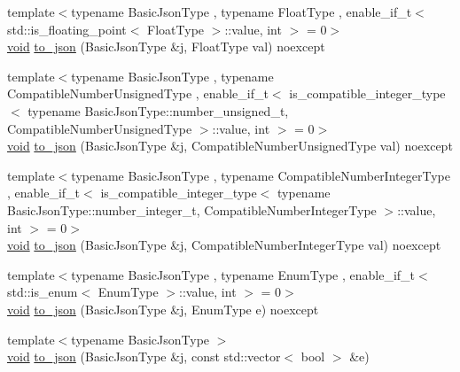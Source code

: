 \begin{DoxyCompactItemize}
\item 
{\footnotesize template$<$typename Basic\+Json\+Type , typename Float\+Type , enable\+\_\+if\+\_\+t$<$ std\+::is\+\_\+floating\+\_\+point$<$ Float\+Type $>$\+::value, int $>$  = 0$>$ }\\\mbox{\hyperlink{namespacenlohmann_1_1detail_a59fca69799f6b9e366710cb9043aa77d}{void}} \mbox{\hyperlink{namespacenlohmann_1_1detail_a22bffdc8bc7e43af380ba2050696b230}{to\+\_\+json}} (Basic\+Json\+Type \&j, Float\+Type val) noexcept
\item 
{\footnotesize template$<$typename Basic\+Json\+Type , typename Compatible\+Number\+Unsigned\+Type , enable\+\_\+if\+\_\+t$<$ is\+\_\+compatible\+\_\+integer\+\_\+type$<$ typename Basic\+Json\+Type\+::number\+\_\+unsigned\+\_\+t, Compatible\+Number\+Unsigned\+Type $>$\+::value, int $>$  = 0$>$ }\\\mbox{\hyperlink{namespacenlohmann_1_1detail_a59fca69799f6b9e366710cb9043aa77d}{void}} \mbox{\hyperlink{namespacenlohmann_1_1detail_ae5fd66b5517b3b5a6c6b9fd9f29ba8dc}{to\+\_\+json}} (Basic\+Json\+Type \&j, Compatible\+Number\+Unsigned\+Type val) noexcept
\item 
{\footnotesize template$<$typename Basic\+Json\+Type , typename Compatible\+Number\+Integer\+Type , enable\+\_\+if\+\_\+t$<$ is\+\_\+compatible\+\_\+integer\+\_\+type$<$ typename Basic\+Json\+Type\+::number\+\_\+integer\+\_\+t, Compatible\+Number\+Integer\+Type $>$\+::value, int $>$  = 0$>$ }\\\mbox{\hyperlink{namespacenlohmann_1_1detail_a59fca69799f6b9e366710cb9043aa77d}{void}} \mbox{\hyperlink{namespacenlohmann_1_1detail_a91fe576be579c8c2fdd14610605c6dd2}{to\+\_\+json}} (Basic\+Json\+Type \&j, Compatible\+Number\+Integer\+Type val) noexcept
\item 
{\footnotesize template$<$typename Basic\+Json\+Type , typename Enum\+Type , enable\+\_\+if\+\_\+t$<$ std\+::is\+\_\+enum$<$ Enum\+Type $>$\+::value, int $>$  = 0$>$ }\\\mbox{\hyperlink{namespacenlohmann_1_1detail_a59fca69799f6b9e366710cb9043aa77d}{void}} \mbox{\hyperlink{namespacenlohmann_1_1detail_a0c8b159dba71981d6c555d284cf6e2bf}{to\+\_\+json}} (Basic\+Json\+Type \&j, Enum\+Type e) noexcept
\item 
{\footnotesize template$<$typename Basic\+Json\+Type $>$ }\\\mbox{\hyperlink{namespacenlohmann_1_1detail_a59fca69799f6b9e366710cb9043aa77d}{void}} \mbox{\hyperlink{namespacenlohmann_1_1detail_aeca6fb5fede5ed1e12a4420d98a5692b}{to\+\_\+json}} (Basic\+Json\+Type \&j, const std\+::vector$<$ bool $>$ \&e)

\end{DoxyCompactItemize}
